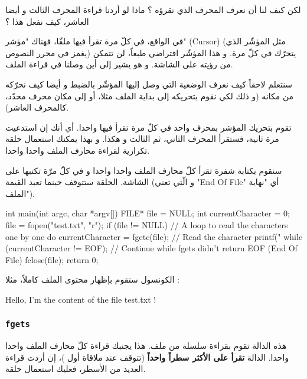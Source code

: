\begin{question}
لكن كيف لنا أن نعرف المحرف الذي نقرؤه ؟ ماذا لو أردنا قراءة المحرف الثالث و أيضا العاشر، كيف نفعل هذا ؟
\end{question}

في الواقع، في كلّ مرة تقرأ فيها ملفّا، فهناك "مؤشر"
(\textenglish{Cursor})
(مثل المؤشّر الذي يغمز في محرر النصوص) يتحرّك في كلّ مرة. و هذا المؤشّر افتراضي طبعاً، لن تتمكن من رؤيته على الشاشة. و هو يشير إلى أين وصلنا في قراءة الملف.

سنتعلم لاحقاً كيف نعرف الوضعية التي وصل إليها المؤشّر بالضبط و أيضا كيف نحرّكه من مكانه (و ذلك لكي نقوم بتحريكه إلى بداية الملف مثلا، أو إلى مكان محرف محدّد، كالمحرف العاشر).

تقوم بتحريك المؤشر بمحرف واحد في كلّ مرة تقرأ فيها واحدا. أي أنك إن استدعيت
مرة ثانية، فستقرأ المحرف الثاني، ثم الثالث و هكذا. و بهذا يمكنك استعمال حلقة تكرارية لقراءة محارف الملف واحدا واحدا.

سنقوم بكتابة شفرة تقرأ كلّ محارف الملف واحدا واحدا و في كلّ مرّة تكتبها على الشاشة. الحلقة ستتوقف حينما تعيد
القيمة
(و الّتي تعني
"\textenglish{End Of File}"
أي "نهاية الملف").

\begin{Csource}
int main(int argc, char *argv[])
{
	FILE* file = NULL;
	int currentCharacter = 0;
	file = fopen("test.txt", "r");
	if (file != NULL)
	{
  		// A loop to read the characters one by one
  		do
  		{
    			currentCharacter = fgetc(file); // Read the character
    			printf("%
  		} while (currentCharacter != EOF); // Continue while fgets didn't return EOF (End Of File)
  		fclose(file);
	}
	return 0;
}
\end{Csource}

الكونسول ستقوم بإظهار محتوى الملف كاملاً، مثلا :

\begin{Console}
Hello, I'm the content of the file test.txt !
\end{Console}

\subsubsection{\texttt{fgets}}

هذه الدالة تقوم بقراءة سلسلة من ملف. هذا يجنبك قراءة كلّ محارف الملف واحدا واحدا. الدالة
\textbf{تقرأ على الأكثر سطراً واحداً}
(تتوقف عند ملاقاة أول
)،
إن أردت قراءة العديد من الأسطر، فعليك استعمال حلقة.

